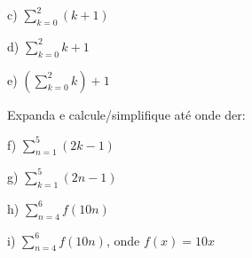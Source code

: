 \documentclass[oneside,12pt]{article}
\begin{document}
{{  \msk
  
  c) $\sum_{k=0}^2 (k+1)$
  
  \msk
  
  d) $\sum_{k=0}^2 k + 1$
  
  \msk
  
  e) $\left( \sum_{k=0}^2 k \right) +1$
  
  \msk
  
  Expanda e calcule/simplifique até onde der:
  
  f) $\sum_{n=1}^5 (2k-1)$
  
  \ssk
  
  g) $\sum_{k=1}^5 (2n-1)$
  
  \ssk
  
  h) $\sum_{n=4}^6 f(10n)$
  
  \ssk

  i) $\sum_{n=4}^6 f(10n)$, onde $f(x) = 10x$

}}


















\end{document}

